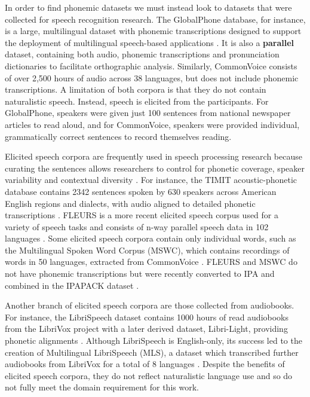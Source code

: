 In order to find phonemic datasets we must instead look to datasets that were collected for speech recognition research. The GlobalPhone database, for instance, is a large, multilingual dataset with phonemic transcriptions designed to support the deployment of multilingual speech-based applications \citep{schultz2002globalphone, schultz2013globalphone}. It is also a \textbf{parallel} dataset, containing both audio, phonemic transcriptions and pronunciation dictionaries to facilitate orthographic analysis. Similarly, CommonVoice \citep{ardila-etal-2020-common} consists of over 2,500 hours of audio across 38 languages, but does not include phonemic transcriptions. A limitation of both corpora is that they do not contain naturalistic speech. Instead, speech is elicited from the participants. For GlobalPhone, speakers were given just 100 sentences from national newspaper articles to read aloud, and for CommonVoice, speakers were provided individual, grammatically correct sentences to record themselves reading.%

Elicited speech corpora are frequently used in speech processing research because curating the sentences allows researchers to control for phonetic coverage, speaker variability and contextual diversity \citep{lamel1989speech}. For instance, the TIMIT acoustic-phonetic database contains 2342 sentences spoken by 630 speakers across American English regions and dialects, with audio aligned to detailed phonetic transcriptions \citep{garofolo1993darpa}. FLEURS is a more recent elicited speech corpus used for a variety of speech tasks and consists of n-way parallel speech data in 102 languages \citep{conneau2023fleurs}. Some elicited speech corpora contain only individual words, such as the Multilingual Spoken Word Corpus (MSWC), which contains recordings of words in 50 languages, extracted from CommonVoice \citep{mazumder2021multilingual}. FLEURS and MSWC do not have phonemic transcriptions but were recently converted to IPA and combined in the IPAPACK dataset \citep{zhu-etal-2024-taste}.

Another branch of elicited speech corpora are those collected from audiobooks. For instance, the LibriSpeech dataset contains 1000 hours of read audiobooks from the LibriVox project \citep{panayotov2015librispeech} with a later derived dataset, Libri-Light, providing phonetic alignments \citep{Kahn_2020}. Although LibriSpeech is English-only, its success led to the creation of Multilingual LibriSpeech (MLS), a dataset which transcribed further audiobooks from LibriVox for a total of 8 languages \citep{pratap2020mls}. Despite the benefits of elicited speech corpora, they do not reflect naturalistic language use and so do not fully meet the domain requirement for this work.

